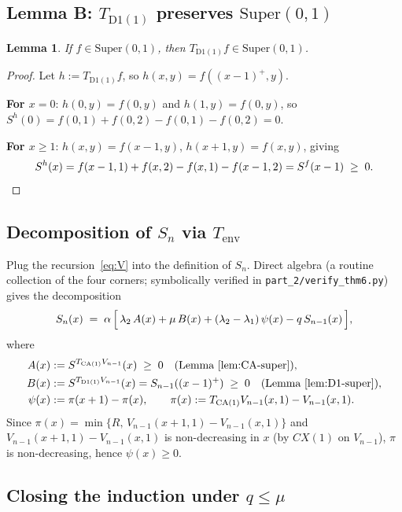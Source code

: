 \documentclass[11pt,a4paper]{article}
\newcommand{\Tenv}{T_{\mathrm{env}}}
\newcommand{\Tca}{T_{\mathrm{CA}(1)}}
\newcommand{\Td}{T_{\mathrm{D1}(1)}}
\newcommand{\Cx}{CX}
\newtheorem{lemma}{Lemma}
\theoremstyle{definition}
\begin{document}
\subsection{Lemma B: $\Td$ preserves $\mathrm{Super}(0, 1)$}

\begin{lemma}
\label{lem:D1-super}
If $f \in \mathrm{Super}(0, 1)$, then $\Td f \in \mathrm{Super}(0, 1)$.
\end{lemma}

\begin{proof}
Let $h := \Td f$, so $h(x, y) = f((x-1)^+, y)$.

\textbf{For $x = 0$}: $h(0, y) = f(0, y)$ and $h(1, y) = f(0, y)$, so
$S^h(0) = f(0, 1) + f(0, 2) - f(0, 1) - f(0, 2) = 0$.

\textbf{For $x \ge 1$}: $h(x, y) = f(x-1, y)$, $h(x+1, y) = f(x, y)$,
giving
\[
    S^h(x) = f(x-1, 1) + f(x, 2) - f(x, 1) - f(x-1, 2) = S^f(x - 1) \;\ge\; 0. \qedhere
\]
\end{proof}

\subsection{Decomposition of $S_n$ via $\Tenv$}
\label{ssec:Sn-step}

Plug the recursion~\eqref{eq:V} into the definition of $S_n$. Direct
algebra (a routine collection of the four corners; symbolically
verified in \texttt{part\_2/verify\_thm6.py}) gives the
decomposition
\begin{equation}
\label{eq:Sn-decomp}
S_n(x) \;=\; \alpha\,\Bigl[\,
    \lambda_2\, A(x)
    + \mu\, B(x)
    + (\lambda_2 - \lambda_1)\, \psi(x)
    - q\, S_{n-1}(x)
\,\Bigr],
\end{equation}
where
\begin{align*}
A(x) &:= S^{\Tca V_{n-1}}(x) \;\ge\; 0 \quad \text{(Lemma~\ref{lem:CA-super})}, \\
B(x) &:= S^{\Td V_{n-1}}(x) = S_{n-1}((x-1)^+) \;\ge\; 0 \quad \text{(Lemma~\ref{lem:D1-super})}, \\
\psi(x) &:= \pi(x+1) - \pi(x), \qquad \pi(x) := \Tca V_{n-1}(x, 1) - V_{n-1}(x, 1).
\end{align*}
Since $\pi(x) = \min\{R,\, V_{n-1}(x+1, 1) - V_{n-1}(x, 1)\}$ and
$V_{n-1}(x+1, 1) - V_{n-1}(x, 1)$ is non-decreasing in $x$ (by
$\Cx(1)$ on $V_{n-1}$), $\pi$ is non-decreasing, hence
$\psi(x) \ge 0$.

\subsection{Closing the induction under $q \le \mu$}
\end{document}

